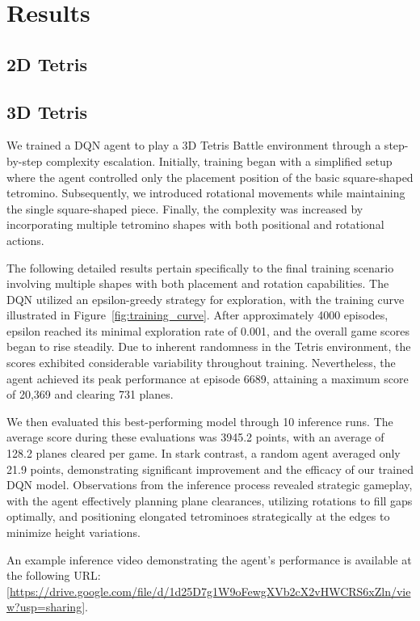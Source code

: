 \section{Results}
\subsection{2D Tetris}
\subsection{3D Tetris}
We trained a DQN agent to play a 3D Tetris Battle environment through a step-by-step complexity escalation. Initially, training began with a simplified setup where the agent controlled only the placement position of the basic square-shaped tetromino. Subsequently, we introduced rotational movements while maintaining the single square-shaped piece. Finally, the complexity was increased by incorporating multiple tetromino shapes with both positional and rotational actions.

The following detailed results pertain specifically to the final training scenario involving multiple shapes with both placement and rotation capabilities. The DQN utilized an epsilon-greedy strategy for exploration, with the training curve illustrated in Figure~\ref{fig:training_curve}. After approximately 4000 episodes, epsilon reached its minimal exploration rate of 0.001, and the overall game scores began to rise steadily. Due to inherent randomness in the Tetris environment, the scores exhibited considerable variability throughout training. Nevertheless, the agent achieved its peak performance at episode 6689, attaining a maximum score of 20,369 and clearing 731 planes.

We then evaluated this best-performing model through 10 inference runs. The average score during these evaluations was 3945.2 points, with an average of 128.2 planes cleared per game. In stark contrast, a random agent averaged only 21.9 points, demonstrating significant improvement and the efficacy of our trained DQN model. Observations from the inference process revealed strategic gameplay, with the agent effectively planning plane clearances, utilizing rotations to fill gaps optimally, and positioning elongated tetrominoes strategically at the edges to minimize height variations.

An example inference video demonstrating the agent’s performance is available at the following URL: \url{[https://drive.google.com/file/d/1d25D7g1W9oFewgXVb2cX2vHWCRS6xZln/view?usp=sharing]}.

